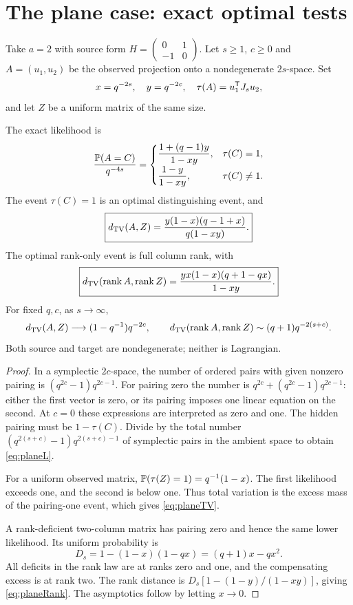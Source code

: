 \section{The plane case: exact optimal tests}\label{sec:plane}

Take $a=2$ with source form
$H=\left(\begin{smallmatrix}0&1\\-1&0\end{smallmatrix}\right)$.
Let $s\ge1$, $c\ge0$ and $A=(u_1,u_2)$ be the observed projection
onto a nondegenerate $2s$-space. Set
\[
 x=q^{-2s},\quad y=q^{-2c},\quad
 \tau(A)=u_1^{\mathsf T}J_su_2,
\]
and let $Z$ be a uniform matrix of the same size.

\begin{theorem}\label{thm:plane}
The exact likelihood is
\begin{equation}\label{eq:planeL}
 \frac{\mathbb P(A=C)}{q^{-4s}}=
 \begin{cases}
 \displaystyle\frac{1+(q-1)y}{1-xy},&\tau(C)=1,\\[6pt]
 \displaystyle\frac{1-y}{1-xy},&\tau(C)\ne1.
 \end{cases}
\end{equation}
The event $\tau(C)=1$ is an optimal distinguishing event, and
\begin{equation}\label{eq:planeTV}
 \boxed{d_{\mathrm{TV}}(A,Z)=\frac{y(1-x)(q-1+x)}{q(1-xy)}.}
\end{equation}
The optimal rank-only event is full column rank, with
\begin{equation}\label{eq:planeRank}
 \boxed{d_{\mathrm{TV}}(\operatorname{rank} A,\operatorname{rank} Z)=
 \frac{yx(1-x)(q+1-qx)}{1-xy}.}
\end{equation}
For fixed $q,c$, as $s\to\infty$,
\[
 d_{\mathrm{TV}}(A,Z)\longrightarrow(1-q^{-1})q^{-2c},
 \qquad
 d_{\mathrm{TV}}(\operatorname{rank} A,\operatorname{rank} Z)\sim(q+1)q^{-2(s+c)}.
\]
Both source and target are nondegenerate; neither is Lagrangian.
\end{theorem}

\begin{proof}
In a symplectic $2c$-space, the number of ordered pairs with given
nonzero pairing is $(q^{2c}-1)q^{2c-1}$.
For pairing zero the number is
$q^{2c}+(q^{2c}-1)q^{2c-1}$: either the first vector is zero,
or its pairing imposes one linear equation on the second.
At $c=0$ these expressions are interpreted as zero and one.
The hidden pairing must be $1-\tau(C)$. Divide by the total number
$(q^{2(s+c)}-1)q^{2(s+c)-1}$ of symplectic pairs in the ambient
space to obtain \eqref{eq:planeL}.

For a uniform observed matrix, $\mathbb P(\tau(Z)=1)=q^{-1}(1-x)$.
The first likelihood exceeds one, and the second is below one.
Thus total variation is the excess mass of the pairing-one event,
which gives \eqref{eq:planeTV}.

A rank-deficient two-column matrix has pairing zero and hence the
same lower likelihood. Its uniform probability is
\[
 D_s=1-(1-x)(1-qx)=(q+1)x-qx^2.
\]
All deficits in the rank law are at ranks zero and one, and the
compensating excess is at rank two. The rank distance is
$D_s[1-(1-y)/(1-xy)]$, giving \eqref{eq:planeRank}.
The asymptotics follow by letting $x\to0$.
\end{proof}

